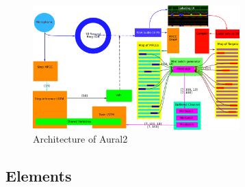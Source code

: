 \documentclass[conference]{IEEEtran}
\begin{document}
\begin{figure}[htbp]
\centerline{\includegraphics[width=80mm]{aural2.png}}
\caption{Architecture of Aural2}
\label{fig}
\end{figure}

\subsection{Elements}
\end{document}
